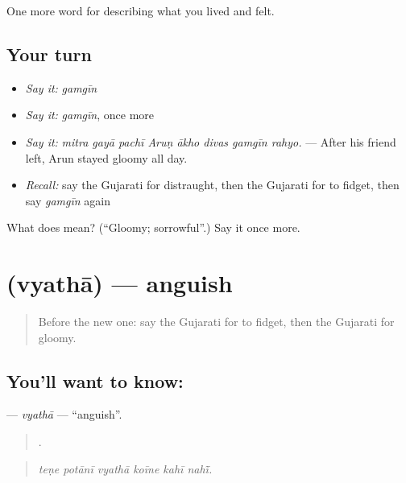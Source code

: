 \begin{grammarlens}[title={What you've built}]
One more word for describing what you lived and felt.
\end{grammarlens}

\subsection*{Your turn}
\begin{itemize}
\raggedright
  \item \emph{Say it:} \emph{gamgīn}
  \item \emph{Say it:} \emph{gamgīn}, once more
  \item \emph{Say it:} \emph{mitra gayā pachī Aruṇ ākho divas gamgīn rahyo.} — After his friend left, Arun stayed gloomy all day.
  \item \emph{Recall:} say the Gujarati for distraught, then the Gujarati for to fidget, then say \emph{gamgīn} again
\end{itemize}

\begin{tcolorbox}[breakable,colback=teal!4,colframe=teal!35!black,title={Before you move on}]
What does  mean? (\textquotedblleft{}Gloomy; sorrowful\textquotedblright{}.) Say it once more.
\end{tcolorbox}
\section[\texorpdfstring{\gu{વ્યથા} (vyathā)}{વ્યથા (vyathā)}]{ (vyathā) — anguish}

\label{lesson:GU-C455-vyatha}



\begin{quote}
Before the new one: say the Gujarati for to fidget, then the Gujarati for gloomy.
\end{quote}

\subsection*{You'll want to know: }
\textbf{} — \emph{vyathā} — \textquotedblleft{}anguish\textquotedblright{}.

\begin{quote}
     .
\end{quote}

\begin{quote}
\emph{teṇe potānī vyathā koīne kahī nahī̃.}
\end{quote}

